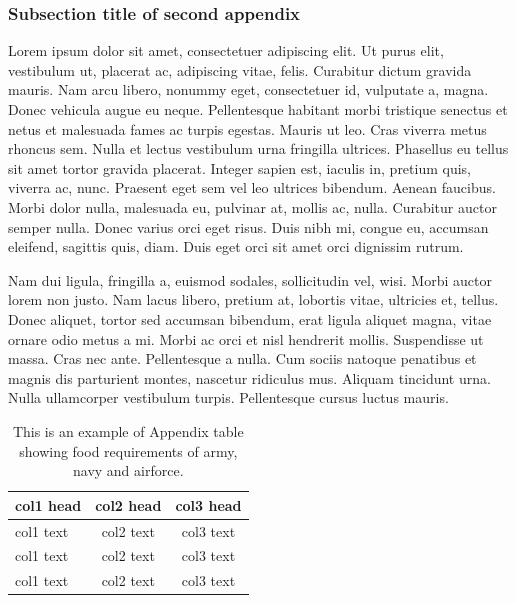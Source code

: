 \documentclass[APA,STIX1COL]{WileyNJD-v2}
\begin{document}
\subsubsection{Subsection title of second appendix\label{app2.1.1a}}

Lorem ipsum dolor sit amet, consectetuer adipiscing elit. Ut purus elit, vestibulum ut, placerat ac, adipiscing vitae,
felis. Curabitur dictum gravida mauris. Nam arcu libero, nonummy eget, consectetuer id, vulputate a, magna. Donec
vehicula augue eu neque. Pellentesque habitant morbi tristique senectus et netus et malesuada fames ac turpis egestas.
Mauris ut leo. Cras viverra metus rhoncus sem. Nulla et lectus vestibulum urna fringilla ultrices. Phasellus eu tellus
sit amet tortor gravida placerat. Integer sapien est, iaculis in, pretium quis, viverra ac, nunc. Praesent eget sem vel
leo ultrices bibendum. Aenean faucibus. Morbi dolor nulla, malesuada eu, pulvinar at, mollis ac, nulla. Curabitur
auctor semper nulla. Donec varius orci eget risus. Duis nibh mi, congue eu, accumsan eleifend, sagittis quis, diam.
Duis eget orci sit amet orci dignissim rutrum.

Nam dui ligula, fringilla a, euismod sodales, sollicitudin vel, wisi. Morbi auctor lorem non justo. Nam lacus libero,
pretium at, lobortis vitae, ultricies et, tellus. Donec aliquet, tortor sed accumsan bibendum, erat ligula aliquet magna,
vitae ornare odio metus a mi. Morbi ac orci et nisl hendrerit mollis. Suspendisse ut massa. Cras nec ante. Pellentesque
a nulla. Cum sociis natoque penatibus et magnis dis parturient montes, nascetur ridiculus mus. Aliquam tincidunt
urna. Nulla ullamcorper vestibulum turpis. Pellentesque cursus luctus mauris.

\begin{center}
\begin{table}[b]%
\centering
\caption{This is an example of Appendix table showing food requirements of army, navy and airforce.\label{tab4}}%
\begin{tabular*}{300pt}{@{\extracolsep\fill}lcc@{\extracolsep\fill}}%
\toprule
\textbf{col1 head} & \textbf{col2 head} & \textbf{col3 head} \\
\midrule
col1 text & col2 text & col3 text \\
col1 text & col2 text & col3 text \\
col1 text & col2 text & col3 text\\
\bottomrule
\end{tabular*}
\end{table}
\end{center}
\end{document}
